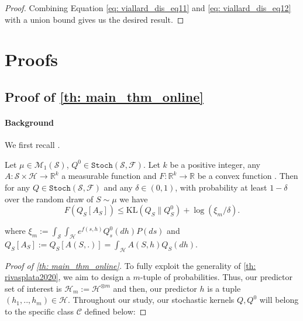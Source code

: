 \begin{noaddcontents}
\begin{proof}[Proof]
Combining Equation \cref{eq: viallard_dis_eq11} and \cref{eq: viallard_dis_eq12} with a union bound gives us the desired result.
\end{proof}











\section{Proofs}
\label{sec: proofs}

\subsection{Proof of \cref{th: main_thm_online}}

\label{sec: proof_main_thm_online}




\paragraph{Background} We first recall \cite[Thm 2]{rivasplata2020pac}.

\begin{theorem}
\label{th: rivasplata2020}
Let $\mu \in \mathcal{M}_{1}(\mathcal{S})$, $Q^{0} \in \texttt{Stoch}(\mathcal{S},\mathcal{F})$. Let $k$ be a positive integer,  any  $A: \mathcal{S} \times \mathcal{H} \rightarrow \mathbb{R}^{k}$ a measurable function and $F: \mathbb{R}^{k} \rightarrow \mathbb{R}$ be a convex function .
Then for any $Q \in \texttt{Stoch}(\mathcal{S},\mathcal{F})$ and any $\delta \in(0,1)$, with probability at least $1-\delta$ over the random draw of $S \sim \mu$ we have
$$
F\left(Q_{S}\left[A_{S}\right]\right) \leq \mathrm{KL}\left(Q_{S} \| Q_{S}^{0}\right)+\log (\xi_m / \delta) .
$$

where $\xi_m:=\int_{\mathcal{S}} \int_{\mathcal{H}} e^{f(s, h)} Q_{s}^{0}(d h) P(d s)$ and $Q_S[A_S]:= Q_S[A(S,.)]= \int_{\mathcal{H}} A(S,h) Q_S(dh)$.
\end{theorem}


\begin{proof}[Proof of \cref{th: main_thm_online}]


To fully exploit the generality of \cref{th: rivasplata2020}, we aim to design a $m$-tuple of probabilities. Thus, our predictor set of interest is $\mathcal{H}_m:= \mathcal{H}^{\otimes m}$ and then, our predictor $h$ is a tuple $(h_1,..,h_m)\in\mathcal{H}$. Throughout our study, our stochastic kernels $Q,Q^0$ will belong to the specific class $\mathcal{C}$ defined below:


\end{proof}
\end{noaddcontents}

